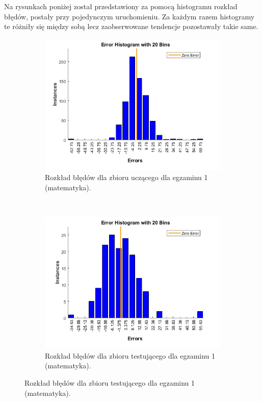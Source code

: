 \documentclass[12pt]{article}
\begin{document}
Na rysunkach poniżej został przedstawiony za pomocą histogramu rozkład błędów, postały przy pojedynczym uruchomieniu. Za każdym razem histogramy te różniły się między sobą lecz zaobserwowane tendencje pozostawały takie same.

\begin{figure}[H]
\centering
\begin{subfigure}[t]{0.48\textwidth} 
\centering
\includegraphics[width=\textwidth]{hist_exam_1_learn.png}
\caption{Rozkład błędów dla zbioru uczącego dla egzaminu 1 (matematyka).}
\end{subfigure}
~~
\begin{subfigure}[t]{0.48\textwidth} 
\centering
\includegraphics[width=\textwidth]{hist_exam_1_test.png}
\caption{Rozkład błędów dla zbioru testującego dla egzaminu 1 (matematyka).}
\end{subfigure}


\end{figure}
\end{document}
